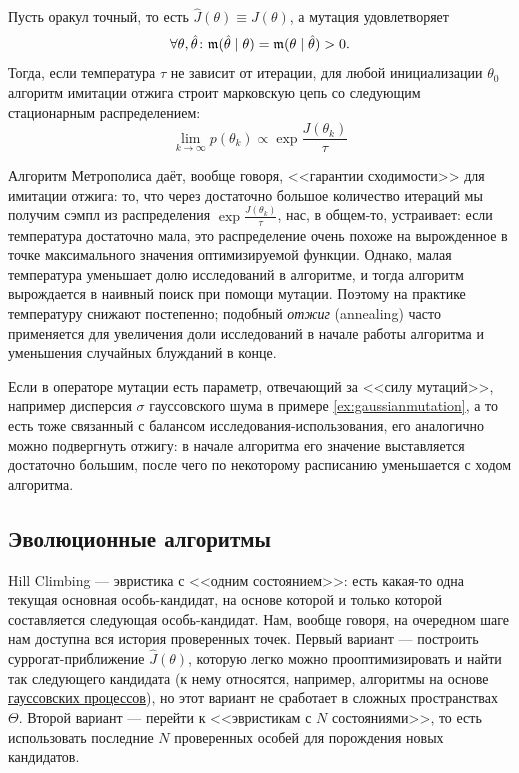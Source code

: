 \begin{proposition}
Пусть оракул точный, то есть $\hat{J}(\theta) \equiv J(\theta)$, а мутация удовлетворяет
$$\forall \theta, \hat{\theta} \colon \mut(\hat{\theta} \HM\mid \theta) = \mut(\theta \HM\mid \hat{\theta}) > 0.$$
Тогда, если температура $\tau$ не зависит от итерации, для любой инициализации $\theta_0$ алгоритм имитации отжига строит марковскую цепь со следующим стационарным распределением:
$$\lim_{k \to \infty} p(\theta_k) \propto \exp \frac{J(\theta_k)}{\tau}$$
\end{proposition}

Алгоритм Метрополиса даёт, вообще говоря, <<гарантии сходимости>> для имитации отжига: то, что через достаточно большое количество итераций мы получим сэмпл из распределения $\exp \frac{J(\theta_k)}{\tau}$, нас, в общем-то, устраивает: если температура достаточно мала, это распределение очень похоже на вырожденное в точке максимального значения оптимизируемой функции. Однако, малая температура уменьшает долю исследований в алгоритме, и тогда алгоритм вырождается в наивный поиск при помощи мутации. Поэтому на практике температуру снижают постепенно; подобный \emph{отжиг} (annealing) часто применяется для увеличения доли исследований в начале работы алгоритма и уменьшения случайных блужданий в конце.

\begin{example}
\begin{center}
\end{center}
\end{example}

\begin{remark}
Если в операторе мутации есть параметр, отвечающий за <<силу мутаций>>, например дисперсия $\sigma$ гауссовского шума в примере \ref{ex:gaussianmutation}, а то есть тоже связанный с балансом исследования-использования, его аналогично можно подвергнуть отжигу: в начале алгоритма его значение выставляется достаточно большим, после чего по некоторому расписанию уменьшается с ходом алгоритма.
\end{remark}

\subsection{Эволюционные алгоритмы}

Hill Climbing --- эвристика с <<одним состоянием>>: есть какая-то одна текущая основная особь-кандидат, на основе которой и только которой составляется следующая особь-кандидат. Нам, вообще говоря, на очередном шаге нам доступна вся история проверенных точек. Первый вариант --- построить суррогат-приближение $\hat{J}(\theta)$, которую легко можно прооптимизировать и найти так следующего кандидата (к нему относятся, например, алгоритмы на основе \href{https://distill.pub/2020/bayesian-optimization/}{гауссовских процессов}), но этот вариант не сработает в сложных пространствах $\Theta$. Второй вариант --- перейти к <<эвристикам с $N$ состояниями>>, то есть использовать последние $N$ проверенных особей для порождения новых кандидатов.

